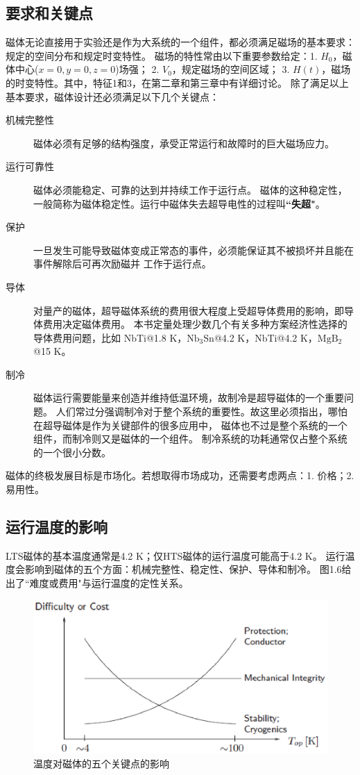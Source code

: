 \subsection{要求和关键点}
磁体无论直接用于实验还是作为大系统的一个组件，都必须满足磁场的基本要求：规定的空间分布和规定时变特性。
磁场的特性常由以下重要参数给定：1. $H_0$，磁体中心($x=0, y=0, z=0$)场强；
2. $V_0$，规定磁场的空间区域；
3. $H(t)$，磁场的时变特性。其中，特征1和3，在第二章和第三章中有详细讨论。
除了满足以上基本要求，磁体设计还必须满足以下几个关键点：
\begin{description}
  \item[机械完整性] 磁体必须有足够的结构强度，承受正常运行和故障时的巨大磁场应力。
  \item[运行可靠性] 磁体必须能稳定、可靠的达到并持续工作于运行点。
  磁体的这种稳定性，一般简称为磁体稳定性。运行中磁体失去超导电性的过程叫\textbf{``失超"}。
  \item[保护] 一旦发生可能导致磁体变成正常态的事件，必须能保证其不被损坏并且能在事件解除后可再次励磁并
  工作于运行点。
  \item[导体] 对量产的磁体，超导磁体系统的费用很大程度上受超导体费用的影响，即导体费用决定磁体费用。
  本书定量处理少数几个有关多种方案经济性选择的导体费用问题，比如
NbTi@1.8 K，$\mathrm{Nb_3Sn}$@4.2 K，NbTi@4.2 K，$\mathrm{MgB_2}$@15 K。
  \item[制冷] 磁体运行需要能量来创造并维持低温环境，故制冷是超导磁体的一个重要问题。
  人们常过分强调制冷对于整个系统的重要性。故这里必须指出，哪怕在超导磁体是作为关键部件的很多应用中，
  磁体也不过是整个系统的一个组件，而制冷则又是磁体的一个组件。
  制冷系统的功耗通常仅占整个系统的一个很小分数。
\end{description}

磁体的终极发展目标是市场化。若想取得市场成功，还需要考虑两点：1. 价格；2. 易用性。

\subsection{运行温度的影响}
LTS磁体的基本温度通常是4.2 K；仅HTS磁体的运行温度可能高于4.2 K。
运行温度会影响到磁体的五个方面：机械完整性、稳定性、保护、导体和制冷。
图1.6给出了``难度或费用"与运行温度的定性关系。
\begin{figure}
  \centering
 \includegraphics[scale=0.6]{chpt1/figs/fig1.6.eps}
  \caption{
温度对磁体的五个关键点的影响
}\label{temperatureeffect}
\end{figure}


